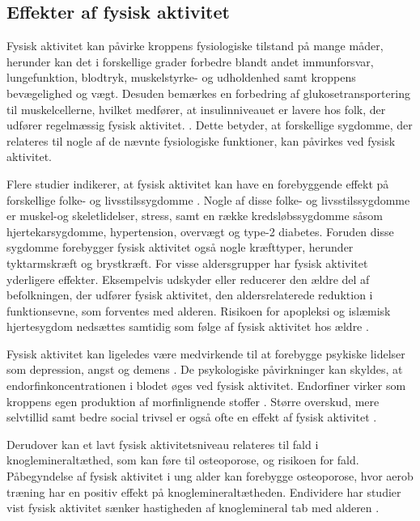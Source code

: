 \subsection{Effekter af fysisk aktivitet}\label{sec:effekterafaktivitet}
Fysisk aktivitet kan påvirke kroppens fysiologiske tilstand på mange måder, herunder kan det i forskellige grader forbedre blandt andet immunforsvar, lungefunktion, blodtryk, muskelstyrke- og udholdenhed samt kroppens bevægelighed og vægt. Desuden bemærkes en forbedring af glukosetransportering til muskelcellerne, hvilket medfører, at insulinniveauet er lavere hos folk, der udfører regelmæssig fysisk aktivitet. \citep{andersen2001, martini2015}. Dette betyder, at forskellige sygdomme, der relateres til nogle af de nævnte fysiologiske funktioner, kan påvirkes ved fysisk aktivitet.

Flere studier indikerer, at fysisk aktivitet kan have en forebyggende effekt på forskellige folke- og livsstilssygdomme \citep{warburton2010}. Nogle af disse folke- og livsstilssygdomme er muskel-og skeletlidelser, stress, samt en række kredsløbssygdomme såsom hjertekarsygdomme, hypertension, overvægt og type-2 diabetes. Foruden disse sygdomme forebygger fysisk aktivitet også nogle kræfttyper, herunder tyktarmskræft og brystkræft. For visse aldersgrupper har fysisk aktivitet yderligere effekter. Eksempelvis udskyder eller reducerer den ældre del af befolkningen, der udfører fysisk aktivitet, den aldersrelaterede reduktion i funktionsevne, som forventes med alderen. Risikoen for apopleksi og islæmisk hjertesygdom nedsættes samtidig som følge af fysisk aktivitet hos ældre \citep{pedersen2011,
warburton2010}. 

Fysisk aktivitet kan ligeledes være medvirkende til at forebygge psykiske lidelser som depression, angst og demens \citep{pedersen2011}. De psykologiske påvirkninger kan skyldes, at endorfinkoncentrationen i blodet øges ved fysisk aktivitet. Endorfiner virker som kroppens egen produktion af morfinlignende stoffer \citep{kessing2016}. Større overskud, mere selvtillid samt bedre social trivsel er også ofte en effekt af fysisk aktivitet \citep{sundhedsstyrelsen2006}. 


Derudover kan et lavt fysisk aktivitetsniveau relateres til fald i knoglemineraltæthed, som kan føre til osteoporose, og risikoen for fald. Påbegyndelse af fysisk aktivitet i ung alder kan forebygge osteoporose, hvor aerob træning har en positiv effekt på knoglemineraltætheden. Endividere har studier vist fysisk aktivitet sænker hastigheden af knoglemineral tab med alderen \citep{sundhedsstyrelsen2006}. 


